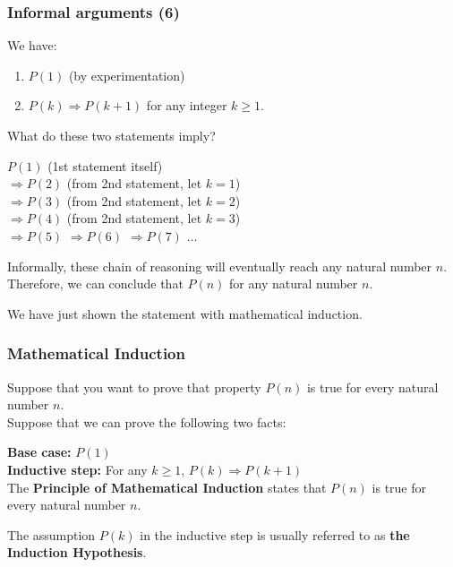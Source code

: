 \begin{frame}\frametitle{Informal arguments (6)}
  We have:
  \begin{enumerate}
  \item $P(1)$ (by experimentation)
  \item $P(k)\Rightarrow P(k+1)$ for any integer $k\geq 1$.
  \end{enumerate}
  What do these two statements imply?
  \pause

  \vspace{0.2in}
  
  $P(1)$ (1st statement itself) \\
  \pause $\Rightarrow P(2)$ (from 2nd statement, let $k=1$) \\
  \pause $\Rightarrow P(3)$ (from 2nd statement, let $k=2$) \\
  \pause $\Rightarrow P(4)$ (from 2nd statement, let $k=3$) \\
  \pause $\Rightarrow P(5)$
  \pause $\Rightarrow P(6)$
  \pause $\Rightarrow P(7)$
  \pause $\ldots$
  \pause

  \vspace{0.2in}

  Informally, these chain of reasoning will eventually reach any
  natural number $n$.  Therefore, we can conclude that $P(n)$ for any
  natural number $n$.

  \pause

  We have just shown the statement with mathematical induction.
  
\end{frame}

\begin{frame}\frametitle{Mathematical Induction}
  \begin{tcolorbox}
    Suppose that you want to prove that property $P(n)$ is true for
    every natural number $n$.\\
    
    Suppose that we can prove the following two facts:
    
    {\bf Base case:} $P(1)$ \\
    {\bf Inductive step:} For any $k\geq 1$, $P(k)\Rightarrow P(k+1)$ \\
    
    The {\bf Principle of Mathematical Induction} states that $P(n)$
    is true for every natural number $n$.
  \end{tcolorbox}

  The assumption $P(k)$ in the inductive step is usually referred to
  as {\bf the Induction Hypothesis}.
  
\end{frame}

